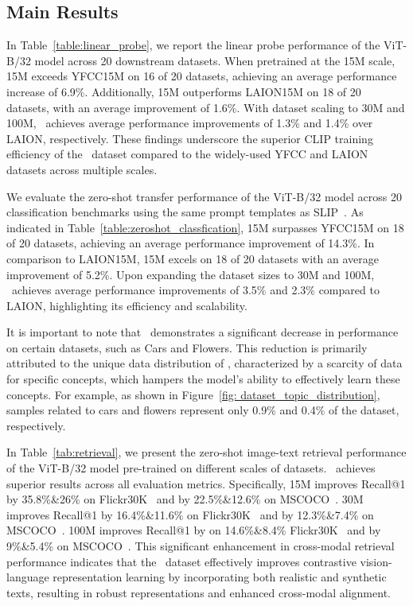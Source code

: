 \subsection{Main Results}
\label{main_result}
 In Table~\ref{table:linear_probe}, we report the linear probe performance of the ViT-B/32 model across 20 downstream datasets. When pretrained at the 15M scale, \dsname15M exceeds YFCC15M on 16 of 20 datasets, achieving an average performance increase of 6.9\%. Additionally, \dsname15M outperforms LAION15M on 18 of 20 datasets, with an average improvement of 1.6\%. With dataset scaling to 30M and 100M, \dsname\ achieves average performance improvements of 1.3\% and 1.4\% over LAION, respectively. These findings underscore the superior CLIP training efficiency of the \dsname\ dataset compared to the widely-used YFCC and LAION datasets across multiple scales.

 We evaluate the zero-shot transfer performance of the ViT-B/32 model across 20 classification benchmarks using the same prompt templates as SLIP~\cite{mu2022slip}. As indicated in Table~\ref{table:zeroshot_classfication}, \dsname15M surpasses YFCC15M on 18 of 20 datasets, achieving an average performance improvement of 14.3\%. In comparison to LAION15M, \dsname15M excels on 18 of 20 datasets with an average improvement of 5.2\%. Upon expanding the dataset sizes to 30M and 100M, \dsname\ achieves average performance improvements of 3.5\% and 2.3\% compared to LAION, highlighting its efficiency and scalability.

It is important to note that \dsname\ demonstrates a significant decrease in performance on certain datasets, such as Cars and Flowers. This reduction is primarily attributed to the unique data distribution of \dsname, characterized by a scarcity of data for specific concepts, which hampers the model’s ability to effectively learn these concepts. For example, as shown in Figure~\ref{fig: dataset_topic_distribution}, samples related to cars and flowers represent only 0.9\% and 0.4\% of the dataset, respectively.


 In Table~\ref{tab:retrieval}, we present the zero-shot image-text retrieval performance of the ViT-B/32 model pre-trained on different scales of datasets. \dsname\ achieves superior results across all evaluation metrics. Specifically, \dsname15M improves Recall@1 by 35.8\%\&26\% on Flickr30K~\cite{flickr30k} and by 22.5\%\&12.6\% on MSCOCO~\cite{mscoco_retrieval}. \dsname30M improves Recall@1 by 16.4\%\&11.6\% on Flickr30K~\cite{flickr30k} and by 12.3\%\&7.4\% on MSCOCO~\cite{mscoco_retrieval}. \dsname100M
improves Recall@1 by on 14.6\%\&8.4\% Flickr30K~\cite{flickr30k} and by 9\%\&5.4\% on MSCOCO~\cite{mscoco_retrieval}. This significant enhancement in cross-modal retrieval performance indicates that the \dsname\ dataset effectively improves contrastive vision-language representation learning by incorporating both realistic and synthetic texts, resulting in robust representations and enhanced cross-modal alignment.



